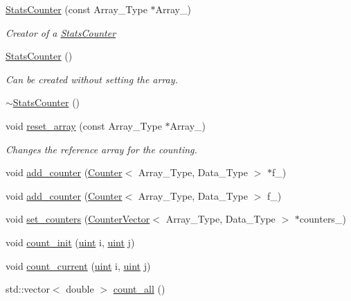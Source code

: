 \begin{DoxyCompactItemize}
\item 
\hyperlink{class_stats_counter_aad1531e93d2d217c5cfd6b389ccf6fba}{Stats\+Counter} (const Array\+\_\+\+Type $\ast$Array\+\_\+)
\begin{DoxyCompactList}\small\item\em Creator of a {\ttfamily \hyperlink{class_stats_counter}{Stats\+Counter}} \end{DoxyCompactList}\item 
\hyperlink{class_stats_counter_a6cef1e5bb4914a49ba8dd0f63070f81c}{Stats\+Counter} ()
\begin{DoxyCompactList}\small\item\em Can be created without setting the array. \end{DoxyCompactList}\item 
\hyperlink{class_stats_counter_a2824d86765d94e909e4b33396250b6c7}{$\sim$\+Stats\+Counter} ()
\item 
void \hyperlink{class_stats_counter_a8dabc3a7a9931acbb76900a67d728f70}{reset\+\_\+array} (const Array\+\_\+\+Type $\ast$Array\+\_\+)
\begin{DoxyCompactList}\small\item\em Changes the reference array for the counting. \end{DoxyCompactList}\item 
void \hyperlink{class_stats_counter_a829e41243a7b18cf71337deeec9f7030}{add\+\_\+counter} (\hyperlink{class_counter}{Counter}$<$ Array\+\_\+\+Type, Data\+\_\+\+Type $>$ $\ast$f\+\_\+)
\item 
void \hyperlink{class_stats_counter_ad175dcd2bd30d017881783de546ac333}{add\+\_\+counter} (\hyperlink{class_counter}{Counter}$<$ Array\+\_\+\+Type, Data\+\_\+\+Type $>$ f\+\_\+)
\item 
void \hyperlink{class_stats_counter_a6aae81ab39ef452aedd7743fa8221855}{set\+\_\+counters} (\hyperlink{class_counter_vector}{Counter\+Vector}$<$ Array\+\_\+\+Type, Data\+\_\+\+Type $>$ $\ast$counters\+\_\+)
\item 
void \hyperlink{class_stats_counter_a19bd5936619e190c0d8918b4f343922e}{count\+\_\+init} (\hyperlink{typedefs_8hpp_a91ad9478d81a7aaf2593e8d9c3d06a14}{uint} i, \hyperlink{typedefs_8hpp_a91ad9478d81a7aaf2593e8d9c3d06a14}{uint} j)
\item 
void \hyperlink{class_stats_counter_ab81166f7cb67eeaecc469016d237019a}{count\+\_\+current} (\hyperlink{typedefs_8hpp_a91ad9478d81a7aaf2593e8d9c3d06a14}{uint} i, \hyperlink{typedefs_8hpp_a91ad9478d81a7aaf2593e8d9c3d06a14}{uint} j)
\item 
std\+::vector$<$ double $>$ \hyperlink{class_stats_counter_a83bd92031a1499109c98f238221cbd67}{count\+\_\+all} ()
\end{DoxyCompactItemize}
